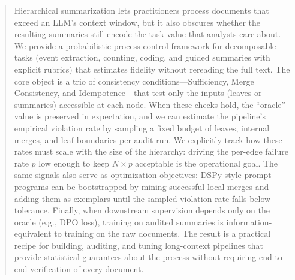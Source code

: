 \begin{abstract}
Hierarchical summarization lets practitioners process documents that exceed an LLM's context window, but it also obscures whether the resulting summaries still encode the task value that analysts care about. We provide a probabilistic process-control framework for decomposable tasks (event extraction, counting, coding, and guided summaries with explicit rubrics) that estimates fidelity without rereading the full text. The core object is a trio of consistency conditions---Sufficiency, Merge Consistency, and Idempotence---that test only the inputs (leaves or summaries) accessible at each node. When these checks hold, the ``oracle'' value is preserved in expectation, and we can estimate the pipeline's empirical violation rate by sampling a fixed budget of leaves, internal merges, and leaf boundaries per audit run. We explicitly track how these rates must scale with the size of the hierarchy: driving the per-edge failure rate $p$ low enough to keep $N\times p$ acceptable is the operational goal. The same signals also serve as optimization objectives: DSPy-style prompt programs can be bootstrapped by mining successful local merges and adding them as exemplars until the sampled violation rate falls below tolerance. Finally, when downstream supervision depends only on the oracle (e.g., DPO loss), training on audited summaries is information-equivalent to training on the raw documents. The result is a practical recipe for building, auditing, and tuning long-context pipelines that provide statistical guarantees about the process without requiring end-to-end verification of every document.
\end{abstract}
